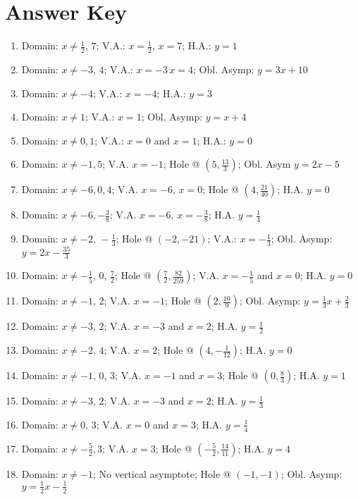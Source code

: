 \newpage

\section{Answer Key}

\begin{enumerate}
    \item Domain: $x \neq \frac{1}{2}, \, 7$; V.A.: $x=\frac{1}{2}, \, x=7$; H.A.: $y=1$
    \item Domain: $x \neq -3, \, 4$; V.A.: $x=-3 \, x = 4$; Obl. Asymp: $y = 3x+10$
    \item Domain: $x \neq -4$; V.A.: $x = -4$; H.A.: $y = 3$
    \item Domain: $x \neq 1$; V.A.: $x = 1$; Obl. Asymp: $y = x + 4$
    \item Domain: $x \neq 0, 1$; V.A.: $x = 0$ and $x = 1$; H.A.: $y = 0$ 
    \item Domain: $x \neq -1, 5$; V.A. $x=-1$; Hole @ $\left(5, \frac{13}{3}\right)$; Obl. Asym $y = 2x-5$
    \item Domain: $x \neq -6, 0, 4$; V.A. $x = -6, \, x = 0$; Hole @ $\left(4, \frac{21}{40}\right)$; H.A. $y = 0$
    \item Domain: $x \neq -6, -\frac{3}{8}$; V.A. $x = -6, \, x = -\frac{3}{8}$; H.A. $y = \frac{1}{4}$
    \item Domain: $x \neq -2, \, -\frac{1}{3}$; Hole @ $(-2,-21)$; V.A.: $x = -\frac{1}{3}$; Obl. Asymp: $y = 2x-\frac{35}{3}$
    \item Domain: $x \neq -\frac{1}{5}, \, 0, \, \frac{7}{2}$; Hole @ $\left(\frac{7}{2}, \frac{82}{259}\right)$; V.A. $x = -\frac{1}{5}$ and $x=0$; H.A. $y=0$
    \item Domain: $x \neq -1, \, 2$; V.A. $x = -1$; Hole @ $\left(2, \frac{10}{9}\right)$; Obl. Asymp: $y = \frac{1}{3}x+\frac{2}{3}$
    \item Domain: $x \neq -3, \, 2$; V.A. $x = -3$ and $x = 2$; H.A. $y = \frac{1}{2}$
    \item Domain: $x \neq -2, \, 4$; V.A. $x = 2$; Hole @ $\left(4, -\frac{1}{12}\right)$; H.A. $y = 0$
    \item Domain: $x \neq -1, \, 0, \, 3$; V.A. $x = -1$ and $x = 3$; Hole @ $\left(0, \frac{8}{3}\right)$; H.A. $y = 1$
    \item Domain: $x \neq -3, \, 2$; V.A. $x = -3$ and $x = 2$; H.A. $y = \frac{1}{3}$
    \item Domain: $x \neq 0, \, 3$; V.A. $x = 0$ and $x = 3$; H.A. $y = \frac{1}{4}$
    \item Domain: $x \neq -\frac{5}{2}, 3$; V.A. $x = 3$; Hole @ $\left(-\frac{5}{2}, \frac{14}{11}\right)$; H.A. $y = 4$
    \item Domain: $x \neq -1$; No vertical asymptote; Hole @ $(-1,-1)$; Obl. Asymp: $y = \frac{1}{2}x-\frac{1}{2}$
    

\end{enumerate}
